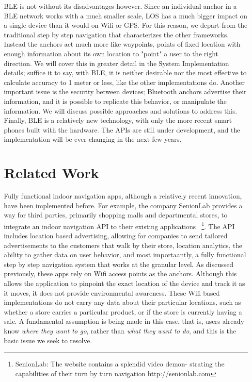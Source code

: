 \documentclass{sig-alternate}
\begin{document}
BLE is not without its disadvantages however. Since an individual
anchor in a BLE network works with a much smaller scale, LOS
has a much bigger impact on a single device than it would on Wifi
or GPS. For this reason, we depart from the traditional step by
step navigation that characterizes the other frameworks. Instead
the anchors act much more like waypoints, points of fixed location
with enough information about its own location to "point" a user
to the right direction. We will cover this in greater detail in the
System Implementation details; suffice it to say, with BLE, it
is neither desirable nor the most effective to calculate accuracy
to 1 meter or less, like the other implementations do. Another 
important issue is the security between devices; Bluetooth anchors
advertise their information, and it is possible to replicate this behavior,
or manipulate the information. We will discuss possible approaches
and solutions to address this. Finally, BLE is a relatively new 
technology, with only the more recent smart phones built with the
hardware. The APIs are still under development, and the implementation
will be ever changing in the next few years.


\section{Related Work}
\label{sec:related_work}
Fully functional indoor navigation apps, although a relatively recent
innovation, have been implemented before. For example, the 
company SenionLab provides a way for third parties, primarily 
shopping malls and departmental stores, to integrate
an indoor navigation API to their existing applications~\cite{senion}
\footnote{SenionLab: The website contains a splendid video demon- 
strating the capabilities of their turn by turn navigation http://senionlab.com}. 
The API includes location based advertising, allowing for
companies to send tailored advertisements to the customers that
walk by their store, location analytics, the ability to gather data on 
user behavior, and most importaantly, a fully functional step by step
navigation system that works at the granular level. As discussed
previously, these apps rely on Wifi access points as the anchors.
Although this allows the application to pinpoint the exact location
of the device and track it as it moves, it does not provide 
environmental awareness. These Wifi based implementations
do not carry any data about their particular locations, such as
whether a store carries a particular product, or if the store is
currently having a sale. A fundamental assumption is being made
in this case, that is, users already know \textit{where they want
to go}, rather than \textit{what they want to do}, and this is the
basic issue we seek to resolve.
\end{document}
